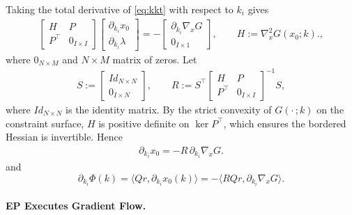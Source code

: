 \documentclass[final, 11pt, nonatbib]{elsarticle}
\theoremstyle{definition}
\theoremstyle{plain}
\numberwithin{equation}{section}
\begin{document}
Taking the total derivative of \eqref{eq:kkt} with respect to $k_i$ gives
\begin{align}
\begin{bmatrix}
H & P\\
P^\top & 0_{I \times I}
\end{bmatrix}
\begin{bmatrix}
\partial_{k_i}x_0\\[2pt]
\partial_{k_i}\lambda
\end{bmatrix}
= -
\begin{bmatrix}
\partial_{k_i}\nabla_x G\\
0_{I \times 1}
\end{bmatrix},\qquad
H := \nabla_x^2 G(x_0;k).\label{eq:lin-kkt},
\end{align}
 where $0_{N \times M}$ and $N \times M$ matrix of zeros. Let
\begin{align}
S := \begin{bmatrix} Id_{N\times N}\\ 0_{I\times N}\end{bmatrix},\qquad
R := S^\top
\begin{bmatrix}
H & P\\
P^\top & 0_{I \times I}
\end{bmatrix}^{-1}\!
S,\label{eq:R}
\end{align}
where $Id_{N \times N}$ is the identity matrix. By the strict convexity of $G(\cdot\,;k)$ on the constraint surface, $H$ is positive definite on $\ker P^\top$, which ensures the bordered Hessian is invertible. Hence
\begin{align}
\partial_{k_i}x_0 = - R\,\partial_{k_i}\nabla_x G.\label{eq:phi-sens}
\end{align}
and
\begin{equation}\partial_{k_i} \Phi(k) = \langle Qr,  \partial_{k_i}x_0(k)\rangle =-\langle RQr,  \partial_{k_i}\nabla_x G\rangle . 
\label{eq:dynamics-grad}
\end{equation}


\paragraph{EP Executes Gradient Flow.}
\end{document}

